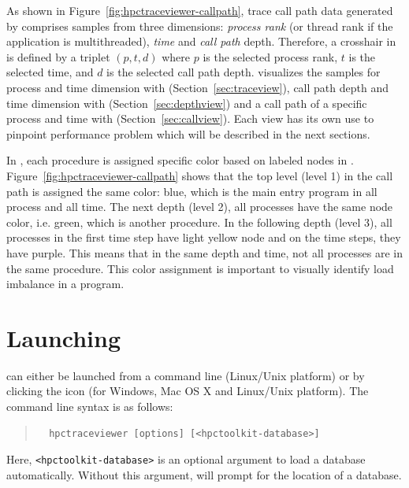 As shown in Figure~\ref{fig:hpctraceviewer-callpath}, trace call path data generated by \hpcprof{} comprises samples from three dimensions: \emph{process rank} (or thread rank if the application is multithreaded), \emph{time} and \emph{call path} depth.
Therefore, a crosshair in \hpctraceviewer{} is defined by a triplet $(p,t,d)$ where $p$ is the selected process rank, $t$ is the selected time, and $d$ is the selected call path depth. 
\hpctraceviewer{} visualizes the samples for process and time dimension with \emph{\traceview} (Section~\ref{sec:traceview}), call path depth and time dimension with \emph{\depthview} (Section~\ref{sec:depthview}) and a call path of a specific process and time with \emph{\callview} (Section~\ref{sec:callview}).
Each view has its own use to pinpoint performance problem which will be described in the next sections.

In \hpctraceviewer, each procedure is assigned specific color based on labeled nodes in \hpcviewer. Figure~\ref{fig:hpctraceviewer-callpath} shows that the top level (level 1) in the call path is assigned the same color: blue, which is the main entry program in all process and all time.
The next depth (level 2), all processes have the same node color, i.e. green, which is another procedure. 
In the following depth (level 3), all processes in the first time step have light yellow node and on the time steps, they have purple. This means that in the same depth and time, not all processes are in the same procedure.
This color assignment is important to visually identify load imbalance in a program.


\section{Launching}

\hpctraceviewer{} can either be launched from a command line (Linux/Unix platform) or by clicking the \hpctraceviewer{} icon (for Windows, Mac OS X and Linux/Unix platform).
The command line syntax is as follows:
\begin{quote}
\begin{verbatim}
  hpctraceviewer [options] [<hpctoolkit-database>]
\end{verbatim}
\end{quote}
Here, \texttt{<hpctoolkit-database>} is an optional argument to load a database automatically.
Without this argument, \hpctraceviewer{} will prompt for the location of a database.

